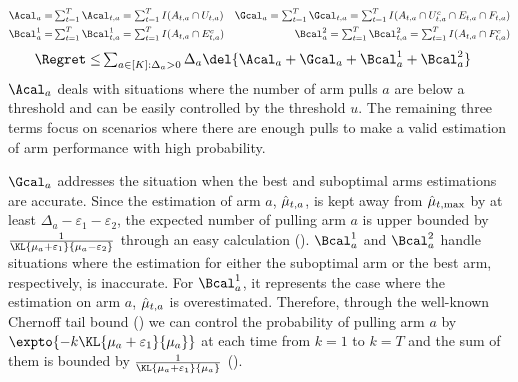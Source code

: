 \begin{align*}
    \Acal_a =& \textstyle\sum_{t=1}^T \Acal_{t, a} = \sum_{t=1}^T I(A_{t,a} \cap U_{t,a})
    & \Gcal_a = \textstyle\sum_{t=1}^T \Gcal_{t, a} = \sum_{t=1}^T I(A_{t,a} \cap U_{t,a}^c \cap E_{t,a} \cap F_{t,a}) \\
    \Bcal_a^1 =& \textstyle\sum_{t=1}^T \Bcal_{t, a}^1 = \sum_{t=1}^T I(A_{t,a} \cap E_{t,a}^c)
    & \Bcal_a^2 = \textstyle\sum_{t=1}^T \Bcal_{t, a}^2 = \sum_{t=1}^T I(A_{t,a} \cap F_{t,a}^c) 
\end{align*}
\begin{align}
    \Regret \leq& \textstyle\sum_{a\in[K]:\Delta_a > 0} \Delta_a \del{\Acal_a + \Gcal_a + \Bcal_a^1 + \Bcal_a^2}
        \label{eqn:regret-decomposition}
\end{align}
$\Acal_{a}$ deals with situations where the number of arm pulls $a$ are below a threshold and can be easily controlled by the threshold $u$.
The remaining three terms focus on scenarios where there are enough pulls to make a valid estimation of arm performance with high probability. 

$\Gcal_{a}$ addresses the situation when the best and suboptimal arms estimations are accurate.
Since the estimation of arm $a$, ${\hat\mu}_{t,a}$, is kept away from ${\hat\mu}_{t,\max}$ by at least $\Delta_a - \varepsilon_1 - \varepsilon_2$, the expected number of pulling arm $a$ is upper bounded by $\frac{1}{\KL{\mu_a+\varepsilon_1}{\mu_a-\varepsilon_2}}$ through an easy calculation ().
$\Bcal^1_{a}$ and $\Bcal^2_{a}$ handle situations where the estimation for either the suboptimal arm or the best arm, respectively, is inaccurate.
For $\Bcal^1_a$, it represents the case where the estimation on arm $a$, ${\hat\mu}_{t, a}$ is overestimated.
Therefore, through the well-known Chernoff tail bound () we can control the probability of pulling arm $a$ by $\expto{-k \KL{\mu_a+\varepsilon_1}{\mu_a}}$ at each time from $k=1$ to $k=T$ and the sum of them is bounded by $\frac{1}{\KL{\mu_a+\varepsilon_1}{\mu_a}}$ ().

